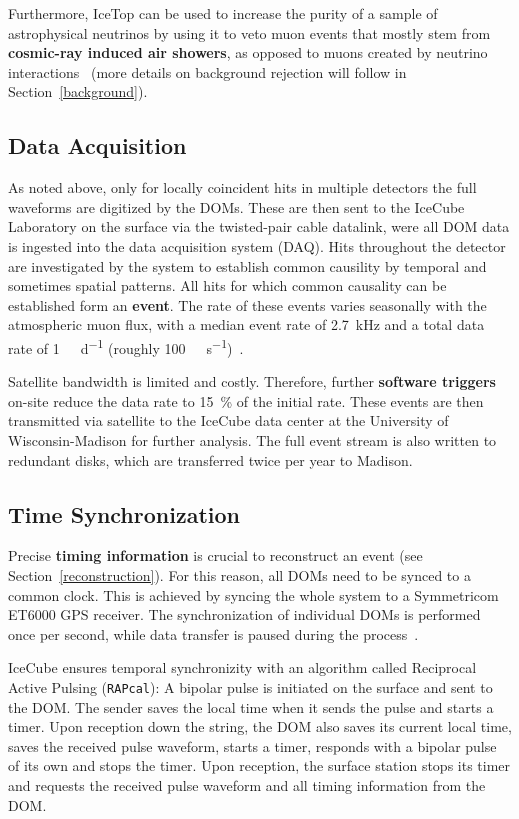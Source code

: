 Furthermore, IceTop can be used to increase the purity of a sample of astrophysical neutrinos by using it to veto muon events that mostly stem from \textbf{cosmic-ray induced air showers}, as opposed to muons created by neutrino interactions~ (more details on background rejection will follow in Section~\ref{background}).

\subsection{Data Acquisition}\label{data_acquisition}
As noted above, only for locally coincident hits in multiple detectors the full waveforms are digitized by the DOMs. These are then sent to the IceCube Laboratory on the surface via the twisted-pair cable datalink, were all DOM data is ingested into the data acquisition system (DAQ). Hits throughout the detector are investigated by the system to establish common causility by temporal and sometimes spatial patterns. All hits for which common causality can be established form an \textbf{event}. The rate of these events varies seasonally with the atmospheric muon flux, with a median event rate of \SI{2.7}{\kilo\Hz} and a total data rate of \SI{1}{\tera\byte\per\day} (roughly \SI{100}{\mega\bit\per\second})~\cite{Aartsen2017}.

Satellite bandwidth is limited and costly. Therefore, further \textbf{software triggers} on-site reduce the data rate to \SI{15}{\percent} of the initial rate. These events are then transmitted via satellite to the IceCube data center at the University of Wisconsin-Madison for further analysis. The full event stream is also written to redundant disks, which are transferred twice per year to Madison.

\subsection{Time Synchronization}
Precise \textbf{timing information} is crucial to reconstruct an event (see Section~\ref{reconstruction}). For this reason, all DOMs need to be synced to a common clock. This is achieved by syncing the whole system to a Symmetricom ET6000 GPS receiver. The synchronization of individual DOMs is performed once per second, while data transfer is paused during the process~.

IceCube ensures temporal synchronizity with an algorithm called Reciprocal Active Pulsing (\texttt{RAPcal}): A bipolar pulse is initiated on the surface and sent to the DOM\@. The sender saves the local time when it sends the pulse and starts a timer. Upon reception down the string, the DOM also saves its current local time, saves the received pulse waveform, starts a timer, responds with a bipolar pulse of its own and stops the timer. Upon reception, the surface station stops its timer and requests the received pulse waveform and all timing information from the DOM.


